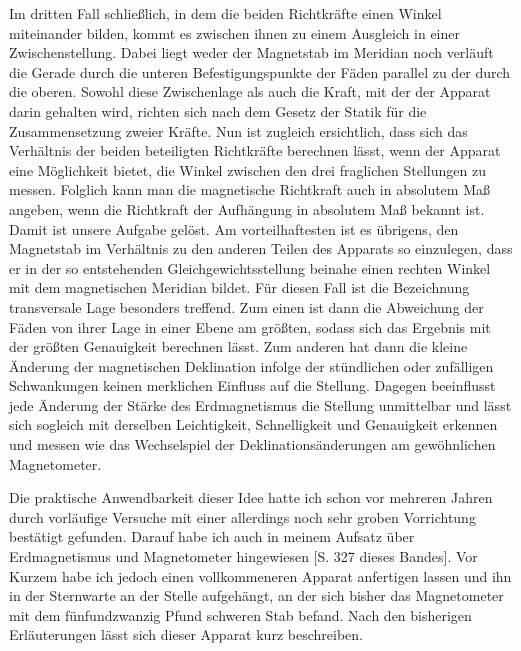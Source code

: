 Im dritten Fall schließlich, in dem die beiden Richtkräfte einen Winkel miteinander bilden, kommt es zwischen ihnen zu einem Ausgleich in einer Zwischenstellung. Dabei liegt weder der Magnetstab im Meridian noch verläuft die Gerade durch die unteren Befestigungspunkte der Fäden parallel zu der durch die oberen. Sowohl diese Zwischenlage als auch die Kraft, mit der der Apparat darin gehalten wird, richten sich nach dem Gesetz der Statik für die Zusammensetzung zweier Kräfte. Nun ist zugleich ersichtlich, dass sich das Verhältnis der beiden beteiligten Richtkräfte berechnen lässt, wenn der Apparat eine Möglichkeit bietet, die Winkel zwischen den drei fraglichen Stellungen zu messen. Folglich kann man die magnetische Richtkraft auch in absolutem Maß angeben, wenn die Richtkraft der Aufhängung in absolutem Maß bekannt ist. Damit ist unsere Aufgabe gelöst. Am vorteilhaftesten ist es übrigens, den Magnetstab im Verhältnis zu den anderen Teilen des Apparats so einzulegen, dass er in der so entstehenden Gleichgewichtsstellung beinahe einen rechten Winkel mit dem magnetischen Meridian bildet. Für diesen Fall ist die Bezeichnung transversale Lage besonders treffend. Zum einen ist dann die Abweichung der Fäden von ihrer Lage in einer Ebene am größten, sodass sich das Ergebnis mit der größten Genauigkeit berechnen lässt. Zum anderen hat dann die kleine Änderung der magnetischen Deklination infolge der stündlichen oder zufälligen Schwankungen keinen merklichen Einfluss auf die Stellung. Dagegen beeinflusst jede Änderung der Stärke des Erdmagnetismus die Stellung unmittelbar und lässt sich sogleich mit derselben Leichtigkeit, Schnelligkeit und Genauigkeit erkennen und messen wie das Wechselspiel der Deklinationsänderungen am gewöhnlichen Magnetometer.

Die praktische Anwendbarkeit dieser Idee hatte ich schon vor mehreren Jahren durch vorläufige Versuche mit einer allerdings noch sehr groben Vorrichtung bestätigt gefunden. Darauf habe ich auch in meinem Aufsatz über Erdmagnetismus und Magnetometer hingewiesen [S. 327 dieses Bandes]. Vor Kurzem habe ich jedoch einen vollkommeneren Apparat anfertigen lassen und ihn in der Sternwarte an der Stelle aufgehängt, an der sich bisher das Magnetometer mit dem fünfundzwanzig Pfund schweren Stab befand. Nach den bisherigen Erläuterungen lässt sich dieser Apparat kurz beschreiben.

